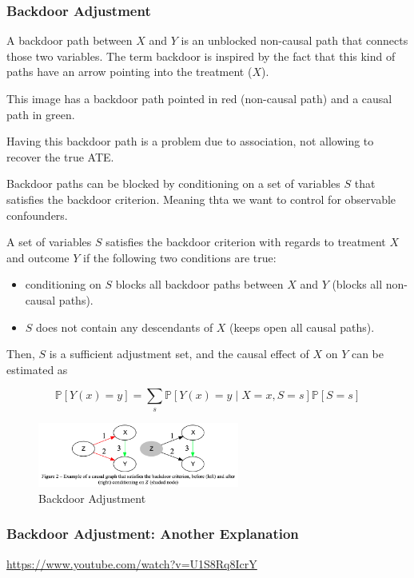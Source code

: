 \documentclass{article}
\begin{document}
\subsubsection{Backdoor Adjustment}
A backdoor path between $X$ and $Y$ is an unblocked non-causal path that connects those two variables. The term backdoor is inspired by the fact that this kind of paths have an arrow pointing into the treatment ($X$).

This image has a backdoor path pointed in red (non-causal path) and a causal path in green.

Having this backdoor path is a problem due to association, not allowing to recover the true ATE.

Backdoor paths can be blocked by conditioning on a set of variables $S$ that satisfies the backdoor criterion. Meaning thta we want to control for observable confounders.

A set of variables $S$ satisfies the backdoor criterion with regards to treatment $X$ and outcome $Y$ if the following two conditions are true:
\begin{itemize}
  \item conditioning on $S$ blocks all backdoor paths between $X$ and $Y$ (blocks all non-causal paths).
  \item $S$ does not contain any descendants of $X$ (keeps open all causal paths).
\end{itemize}

Then, $S$ is a sufficient adjustment set, and the causal effect of $X$ on $Y$ can be estimated as

$$
\mathbb{P}[Y(x) = y] = \sum_s \mathbb{P}[Y(x) = y \mid X = x, S = s] \mathbb{P}[S = s]
$$

\begin{figure}[H]
  \centering
  \includegraphics[width=250px]{draft-photos/backdoor_adjustment.png}
  \caption{Backdoor Adjustment}
  \label{fig:backdoor_adjustment}
\end{figure}

\subsubsection{Backdoor Adjustment: Another Explanation}

\url{https://www.youtube.com/watch?v=U1S8Rq8IcrY}
\end{document}
